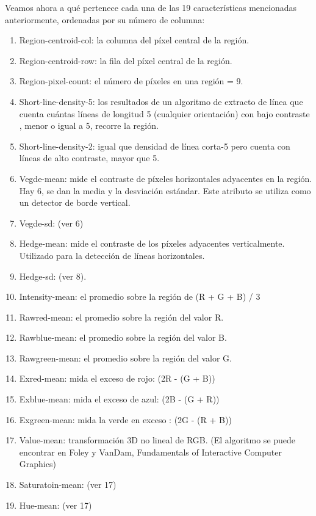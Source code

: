 \documentclass[11pt,a4paper]{article}
\begin{document}
Veamos ahora a qué pertenece cada una de las 19 características mencionadas anteriormente, ordenadas por su número de columna:

\begin{enumerate}
	\item Region-centroid-col: la columna del píxel central de la región.
	\item Region-centroid-row: la fila del píxel central de la región. 
	\item Region-pixel-count: el número de píxeles en una región = 9. 
	\item Short-line-density-5: los resultados de un algoritmo de extracto de línea que cuenta cuántas líneas de longitud 5 (cualquier orientación) con bajo contraste , menor o igual a 5, recorre la región. 
	\item Short-line-density-2: igual que densidad de línea corta-5 pero cuenta con líneas de alto contraste, mayor que 5. 
	\item Vegde-mean: mide el contraste de píxeles horizontales adyacentes en la región. Hay 6, se dan la media y la desviación estándar. Este atributo se utiliza como un detector de borde vertical. 
	\item Vegde-sd: (ver 6) 
	\item Hedge-mean: mide el contraste de los píxeles adyacentes verticalmente. Utilizado para la detección de líneas horizontales. 
	\item Hedge-sd: (ver 8). 
	\item Intensity-mean: el promedio sobre la región de (R + G + B) / 3 
	\item Rawred-mean: el promedio sobre la región del valor R. 
	\item Rawblue-mean: el promedio sobre la región del valor B. 
	\item Rawgreen-mean: el promedio sobre la región del valor G. 
	\item Exred-mean: mida el exceso de rojo: (2R - (G + B)) 
	\item Exblue-mean: mida el exceso de azul: (2B - (G + R)) 
	\item Exgreen-mean: mida la verde en exceso : (2G - (R + B)) 
	\item Value-mean: transformación 3D no lineal de RGB. (El algoritmo se puede encontrar en Foley y VanDam, Fundamentals of Interactive Computer Graphics) 
	\item Saturatoin-mean: (ver 17)
	\item Hue-mean: (ver 17)
\end{enumerate}
\end{document}
